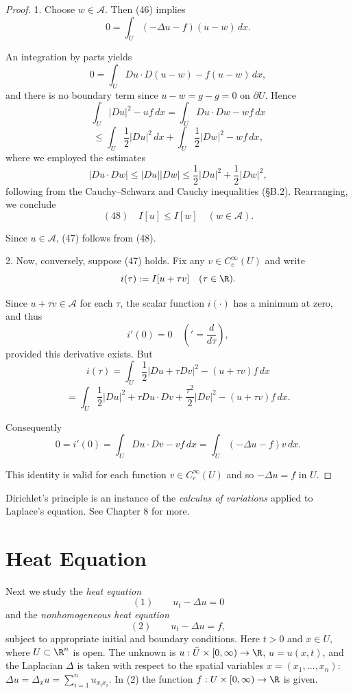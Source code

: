 \begin{proof}
1. Choose $w \in \mathcal{A}$. Then (46) implies
$$0 = \int_U (-\Delta u - f)(u - w) \, dx.$$

An integration by parts yields
$$0 = \int_U Du \cdot D(u - w) - f(u - w) \, dx,$$
and there is no boundary term since $u - w = g - g = 0$ on $\partial U$. Hence
$$\int_U |Du|^2 - uf \, dx = \int_U Du \cdot Dw - wf \, dx$$
$$\leq \int_U \frac{1}{2}|Du|^2 \, dx + \int_U \frac{1}{2}|Dw|^2 - wf \, dx,$$
where we employed the estimates
$$|Du \cdot Dw| \leq |Du||Dw| \leq \frac{1}{2}|Du|^2 + \frac{1}{2}|Dw|^2,$$
following from the Cauchy--Schwarz and Cauchy inequalities (\S B.2). Rearranging, we conclude
$$(48) \quad I[u] \leq I[w] \quad (w \in \mathcal{A}).$$

Since $u \in \mathcal{A}$, (47) follows from (48).

2. Now, conversely, suppose (47) holds. Fix any $v \in C_c^\infty(U)$ and write
$$i(\tau) := I[u + \tau v] \quad (\tau \in \R).$$

Since $u + \tau v \in \mathcal{A}$ for each $\tau$, the scalar function $i(\cdot)$ has a minimum at zero, and thus
$$i'(0) = 0 \quad \left(' = \frac{d}{d\tau}\right),$$
provided this derivative exists. But
$$i(\tau) = \int_U \frac{1}{2}|Du + \tau Dv|^2 - (u + \tau v)f \, dx$$
$$= \int_U \frac{1}{2}|Du|^2 + \tau Du \cdot Dv + \frac{\tau^2}{2}|Dv|^2 - (u + \tau v)f \, dx.$$

Consequently
$$0 = i'(0) = \int_U Du \cdot Dv - vf \, dx = \int_U (-\Delta u - f)v \, dx.$$

This identity is valid for each function $v \in C_c^\infty(U)$ and so $-\Delta u = f$ in $U$.
\end{proof}

Dirichlet's principle is an instance of the \textit{calculus of variations} applied to Laplace's equation. See Chapter 8 for more.

\section{Heat Equation}
\label{sec:heat-equation}

Next we study the \textit{heat equation}
$$(1) \qquad u_t - \Delta u = 0$$
and the \textit{nonhomogeneous heat equation}
$$(2) \qquad u_t - \Delta u = f,$$
subject to appropriate initial and boundary conditions. Here $t > 0$ and $x \in U$, where $U \subset \R^n$ is open. The unknown is $u: \bar{U} \times [0, \infty) \to \R$, $u = u(x,t)$, and the Laplacian $\Delta$ is taken with respect to the spatial variables $x = (x_1, \ldots, x_n)$: $\Delta u = \Delta_x u = \sum_{i=1}^n u_{x_i x_i}$. In (2) the function $f: U \times [0, \infty) \to \R$ is given.

